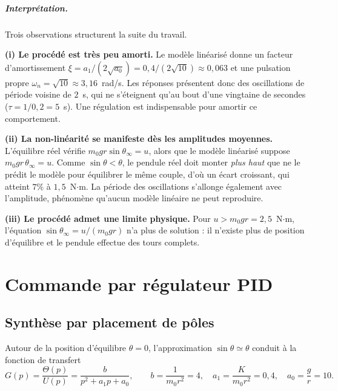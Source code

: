 \documentclass[11pt,a4paper]{report}
\begin{document}
\paragraph{Interprétation.} Trois observations structurent la suite du travail.

\textbf{(i) Le procédé est très peu amorti.} Le modèle linéarisé donne un facteur
d'amortissement $\xi = a_1/(2\sqrt{a_0}) = 0{,}4/(2\sqrt{10}) \approx 0{,}063$ et une pulsation
propre $\omega_n = \sqrt{10} \approx 3{,}16$~rad/s. Les réponses présentent donc des
oscillations de période voisine de $2$~s, qui ne s'éteignent qu'au bout d'une vingtaine de
secondes ($\tau = 1/0{,}2 = 5$~s). Une régulation est indispensable pour amortir ce
comportement.

\textbf{(ii) La non-linéarité se manifeste dès les amplitudes moyennes.} L'équilibre réel vérifie
$m_0 g r \sin\theta_\infty = u$, alors que le modèle linéarisé suppose
$m_0 g r\,\theta_\infty = u$. Comme $\sin\theta < \theta$, le pendule réel doit monter
\emph{plus haut} que ne le prédit le modèle pour équilibrer le même couple, d'où un écart
croissant, qui atteint $7\%$ à $1{,}5$~N$\cdot$m. La période des oscillations s'allonge également
avec l'amplitude, phénomène qu'aucun modèle linéaire ne peut reproduire.

\textbf{(iii) Le procédé admet une limite physique.} Pour $u > m_0 g r = 2{,}5$~N$\cdot$m,
l'équation $\sin\theta_\infty = u/(m_0 g r)$ n'a plus de solution : il n'existe plus de position
d'équilibre et le pendule effectue des tours complets.

\chapter{Commande par régulateur PID}

\section{Synthèse par placement de pôles}

Autour de la position d'équilibre $\theta = 0$, l'approximation $\sin\theta \simeq \theta$
conduit à la fonction de transfert
\begin{equation}
  G(p) = \frac{\Theta(p)}{U(p)} = \frac{b}{p^2 + a_1 p + a_0},
  \qquad
  b = \frac{1}{m_0 r^2} = 4,\quad a_1 = \frac{K}{m_0 r^2} = 0{,}4,\quad a_0 = \frac{g}{r} = 10 .
  \label{eq:G}
\end{equation}
\end{document}

